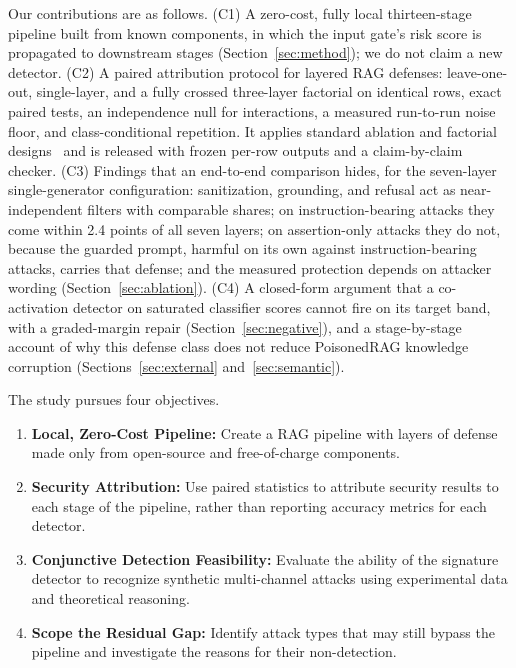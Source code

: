 \documentclass[conference]{IEEEtran}
\begin{document}
Our contributions are as follows. (C1) A zero-cost, fully local thirteen-stage pipeline built from known components, in which the input gate's risk score is propagated to downstream stages (Section~\ref{sec:method}); we do not claim a new detector. (C2) A paired attribution protocol for layered RAG defenses: leave-one-out, single-layer, and a fully crossed three-layer factorial on identical rows, exact paired tests, an independence null for interactions, a measured run-to-run noise floor, and class-conditional repetition. It applies standard ablation and factorial designs~\cite{fawcett2016ablation,hutter2014fanova} and is released with frozen per-row outputs and a claim-by-claim checker. (C3) Findings that an end-to-end comparison hides, for the seven-layer single-generator configuration: sanitization, grounding, and refusal act as near-independent filters with comparable shares; on instruction-bearing attacks they come within 2.4 points of all seven layers; on assertion-only attacks they do not, because the guarded prompt, harmful on its own against instruction-bearing attacks, carries that defense; and the measured protection depends on attacker wording (Section~\ref{sec:ablation}). (C4) A closed-form argument that a co-activation detector on saturated classifier scores cannot fire on its target band, with a graded-margin repair (Section~\ref{sec:negative}), and a stage-by-stage account of why this defense class does not reduce PoisonedRAG knowledge corruption (Sections~\ref{sec:external} and~\ref{sec:semantic}).

The study pursues four objectives.
\begin{enumerate}
\item[(i)] \textbf{Local, Zero-Cost Pipeline:} Create a RAG pipeline with layers of defense made only from open-source and free-of-charge components.
\item[(ii)] \textbf{Security Attribution:} Use paired statistics to attribute security results to each stage of the pipeline, rather than reporting accuracy metrics for each detector.
\item[(iii)] \textbf{Conjunctive Detection Feasibility:} Evaluate the ability of the signature detector to recognize synthetic multi-channel attacks using experimental data and theoretical reasoning.
\item[(iv)] \textbf{Scope the Residual Gap:} Identify attack types that may still bypass the pipeline and investigate the reasons for their non-detection.
\end{enumerate}
\end{document}
